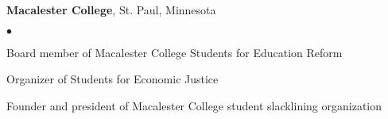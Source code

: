 \documentclass[margin,centered]{res}
\newenvironment{list1}{
  \begin{list}{\ding{113}}{%
      \setlength{\itemsep}{0in}
      \setlength{\parsep}{0in} \setlength{\parskip}{0in}
      \setlength{\topsep}{0in} \setlength{\partopsep}{0in}
      \setlength{\leftmargin}{0.17in}}}{\end{list}}
\newenvironment{list2}{
  \begin{list}{$\bullet$}{%
      \setlength{\itemsep}{0in}
      \setlength{\parsep}{0in} \setlength{\parskip}{0in}
      \setlength{\topsep}{0in} \setlength{\partopsep}{0in}
      \setlength{\leftmargin}{0.2in}}}{\end{list}}
\begin{document}
\begin{resume}


{\bf Macalester College}, St. Paul, Minnesota
\begin{list1}
\item[]
\begin{list2}
\vspace*{.05in}
\item Board member of Macalester College Students for Education Reform
\item Organizer of Students for Economic Justice
\item Founder and president of Macalester College student slacklining organization
\end{list2}
\end{list1}


\begin{comment}
\section{\sc Interests}
\begin{list1}
\item[] 



\begin{list2}
\item Biking, hiking, board games, and slacklining
\end{list2} 
\end{list1}
\end{comment}

\end{resume}
\end{document}
